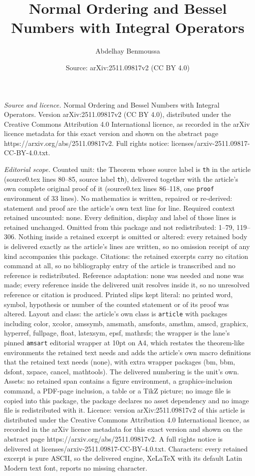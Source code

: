 \documentclass[10pt,a4paper]{amsart}
\title[Normal Ordering and Bessel Numbers with Integral Operators]{Normal Ordering and Bessel Numbers with Integral Operators}
\author{Abdelhay Benmoussa}
\date{Source: arXiv:2511.09817v2 (CC BY 4.0)}
\begin{document}
\maketitle

\noindent\emph{Source and licence.} Normal Ordering and Bessel Numbers with Integral Operators. Version arXiv:2511.09817v2 (CC BY 4.0), distributed under the Creative Commons Attribution 4.0 International licence, as recorded in the arXiv licence metadata for this exact version and shown on the abstract page https://arxiv.org/abs/2511.09817v2. Full rights notice: licenses/arxiv-2511.09817-CC-BY-4.0.txt.\par\smallskip

\noindent\textit{Editorial scope.} Counted unit: the Theorem whose source label is \texttt{th} in the article (source0.tex lines 80--85, source label \texttt{th}), delivered together with the article's own complete original proof of it (source0.tex lines 86--118, one \texttt{proof} environment of 33 lines). No mathematics is written, repaired or re-derived: statement and proof are the article's own text line for line. Required context retained uncounted: none. Every definition, display and label of those lines is retained unchanged. Omitted from this package and not redistributed: 1--79, 119--306. Nothing inside a retained excerpt is omitted or altered: every retained body is delivered exactly as the article's lines are written, so no omission receipt of any kind accompanies this package. Citations: the retained excerpts carry no citation command at all, so no bibliography entry of the article is transcribed and no reference is redistributed. Reference adaptation: none was needed and none was made; every reference inside the delivered unit resolves inside it, so no unresolved reference or citation is produced. Printed slips kept literal: no printed word, symbol, hypothesis or number of the counted statement or of its proof was altered. Layout and class: the article's own class is \texttt{article} with packages including color, xcolor, amssymb, amsmath, amsfonts, amsthm, amscd, graphicx, hyperref, fullpage, float, latexsym, epsf, mathrsfs; the wrapper is the lane's pinned \texttt{amsart} editorial wrapper at 10pt on A4, which restates the theorem-like environments the retained text needs and adds the article's own macro definitions that the retained text needs (none), with extra wrapper packages (bm, bbm, dsfont, xspace, cancel, mathtools). The delivered numbering is the unit's own. Assets: no retained span contains a figure environment, a graphics-inclusion command, a PDF-page inclusion, a table or a TikZ picture; no image file is copied into this package, the package declares no asset dependency and no image file is redistributed with it. Licence: version arXiv:2511.09817v2 of this article is distributed under the Creative Commons Attribution 4.0 International licence, as recorded in the arXiv licence metadata for this exact version and shown on the abstract page https://arxiv.org/abs/2511.09817v2. A full rights notice is delivered at licenses/arxiv-2511.09817-CC-BY-4.0.txt. Characters: every retained excerpt is pure ASCII, so the delivered engine, XeLaTeX with its default Latin Modern text font, reports no missing character.
\end{document}
